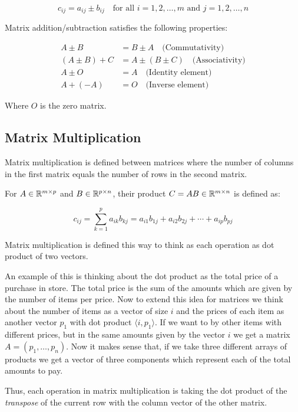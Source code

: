 \[
    c_{ij} = a_{ij} \pm b_{ij} \quad \text{for all } i = 1, 2, \ldots, m \text{ and } j = 1, 2, \ldots, n
\]

Matrix addition/subtraction satisfies the following properties:

\begin{align*}
    A \pm B &= B \pm A \quad \text{(Commutativity)} \\
    (A \pm B) + C &= A \pm (B \pm C) \quad \text{(Associativity)} \\
    A \pm O &= A \quad \text{(Identity element)} \\
    A + (-A) &= O \quad \text{(Inverse element)}
\end{align*}

Where \(O\) is the zero matrix.

\subsection{Matrix Multiplication}

Matrix multiplication is defined between matrices where the number of columns in the first 
matrix equals the number of rows in the second matrix.

For \(A \in \mathbb{R}^{m \times p}\) and \(B \in \mathbb{R}^{p \times n}\), their product \(C = AB \in \mathbb{R}^{m \times n}\) is defined as:

\[
    c_{ij} = \sum_{k=1}^{p} a_{ik}b_{kj} = a_{i1}b_{1j} + a_{i2}b_{2j} + \cdots + a_{ip}b_{pj}
\]

Matrix multiplication is defined this way to think as each operation as dot product of two vectors.

An example of this is thinking about the dot product as the total price of a purchase in store. 
The total price is the sum of the amounts which are given by the number of items per price. Now to extend this idea 
for matrices we think about the number of items as a vector of size \(i\) and the prices of each item as 
another vector \(p_1\) with dot product \(\langle i, p_1 \rangle\). If we want to by other items with different prices, but in the 
same amounts given by the vector \(i\) we get a matrix \(A = (p_1, \dots, p_n)\). Now it makes sense that, if 
we take three different arrays of products we get a vector of three components which represent each of the 
total amounts to pay.

Thus, each operation in matrix multiplication is taking the dot product of the \emph{transpose} 
of the current row with the column vector of the other matrix.

